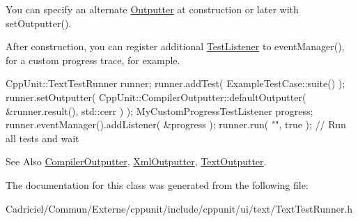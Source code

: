 You can specify an alternate \hyperlink{class_outputter}{Outputter} at construction or later with set\-Outputter().

After construction, you can register additional \hyperlink{class_test_listener}{Test\-Listener} to event\-Manager(), for a custom progress trace, for example.


\begin{DoxyCode}
CppUnit::TextTestRunner runner;
runner.addTest( ExampleTestCase::suite() );
runner.setOutputter( CppUnit::CompilerOutputter::defaultOutputter( 
                         &runner.result(),
                         std::cerr ) );
MyCustomProgressTestListener progress;
runner.eventManager().addListener( &progress );
runner.run( \textcolor{stringliteral}{""}, \textcolor{keyword}{true} );    \textcolor{comment}{// Run all tests and wait}
\end{DoxyCode}


\begin{DoxySeeAlso}{See Also}
\hyperlink{class_compiler_outputter}{Compiler\-Outputter}, \hyperlink{class_xml_outputter}{Xml\-Outputter}, \hyperlink{class_text_outputter}{Text\-Outputter}. 
\end{DoxySeeAlso}


The documentation for this class was generated from the following file\-:\begin{DoxyCompactItemize}
\item 
Cadriciel/\-Commun/\-Externe/cppunit/include/cppunit/ui/text/Text\-Test\-Runner.\-h\end{DoxyCompactItemize}
